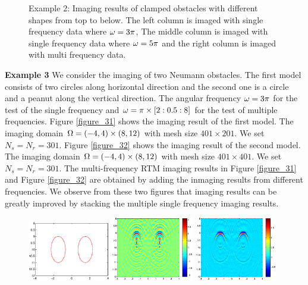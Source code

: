 \documentclass[12pt]{iopart}
\begin{document}
{\begin{figure}
	\caption{Example 2: Imaging results of clamped obstacles
		with different shapes from top to below. The left column is imaged with single frequency data where $\omega=3\pi$, The middle column is imaged with single frequency data where $\omega=5\pi$ and the right column is imaged with multi frequency data.}\label{figure_2}
\end{figure}

\bigskip
\textbf{Example 3} We consider the imaging of two Neumann obstacles. The first model
consists of two circles along horizontal direction and the second one is a circle and a
peanut along the vertical direction. The angular frequency $\omega=3\pi$ for the test of the single frequency and $\omega=\pi\times[2:0.5:8]$ for the test of multiple frequencies. Figure \ref{figure_31} shows the imaging result of the first model. The
imaging domain $\Omega=(-4, 4) \times (8,12)$ with mesh size $401 \times 201$. We set $N_s = N_r = 301$. Figure \ref{figure_32}
 shows the imaging result of the second model. The
 imaging domain $\Omega=(-4, 4)\times (8,12)$ with mesh size $401 \times 401$. We set $N_s = N_r = 301$. The multi-frequency RTM imaging results in Figure \ref{figure_31} and Figure \ref{figure_32} are obtained by adding the inmaging results from different frequencies. We observe from these two figures that imaging results can be greatly improved by stacking the multiple single frequency imaging results. 
\begin{figure}
	\centering
	\includegraphics[width=0.32\textwidth,height=0.16\textheight]{./graphic/bi_circle_profile.eps}
	\includegraphics[width=0.32\textwidth]{./graphic/bi_circle_3pi.eps}
	\includegraphics[width=0.32\textwidth]{./graphic/bi_circle.eps}
	

\end{figure}}
\end{document}
